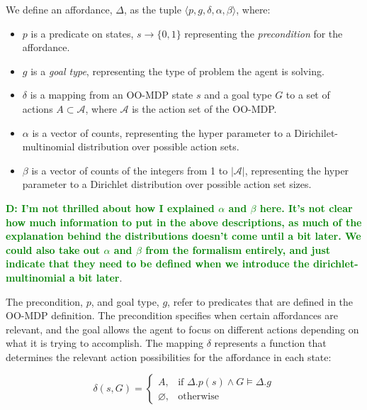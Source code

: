 \documentclass[conference]{IEEEtran}
\newcommand{\dnote}[1]{\textcolor{Green}{\textbf{D: #1}}}
\begin{document}
We define an affordance, $\Delta$, as the tuple $\langle p, g, \delta, \alpha, \beta \rangle$,
where:
\begin{itemize}
\item $p$ is a predicate on states, $s \longrightarrow \{$0$, 1\}$ representing the {\em precondition} for the affordance. 
\item $g$ is a {\it goal type}, representing the type of problem the agent is solving.
\item $\delta$ is a mapping from an OO-MDP state $s$ and a goal type $G$ to a set of actions $A \subset \mathcal{A}$, where $\mathcal{A}$ is the action set of the OO-MDP.
\item $\alpha$ is a vector of counts, representing the hyper parameter to a Dirichilet-multinomial distribution over possible action sets.
\item $\beta$ is a vector of counts of the integers from 1 to $|\mathcal{A}|$, representing the hyper parameter to a Dirichlet distribution over possible action set sizes.
\end{itemize}
\dnote{I'm not thrilled about how I explained $\alpha$ and $\beta$ here. It's not clear how much information to put in the above descriptions, as much of the explanation behind the distributions doesn't come until a bit later. We could also take out $\alpha$ and $\beta$ from the formalism entirely, and just indicate that they need to be defined when we introduce the dirichlet-multinomial a bit later}.

The precondition, $p$, and goal type, $g$, refer to predicates that are defined in the OO-MDP definition.
The precondition specifies when certain affordances are relevant, and the goal allows the agent to focus
on different actions depending on what it is trying to accomplish. The mapping $\delta$
represents a function that determines the relevant action possibilities for the affordance in each state:

\begin{equation}
\delta(s,G)= 
\begin{cases}
    A, & \text{if } \Delta.p(s) \wedge G \models \Delta.g \\
    \varnothing,              & \text{otherwise}
\end{cases}
\label{eq:delta_mapping}
\end{equation}
\end{document}

